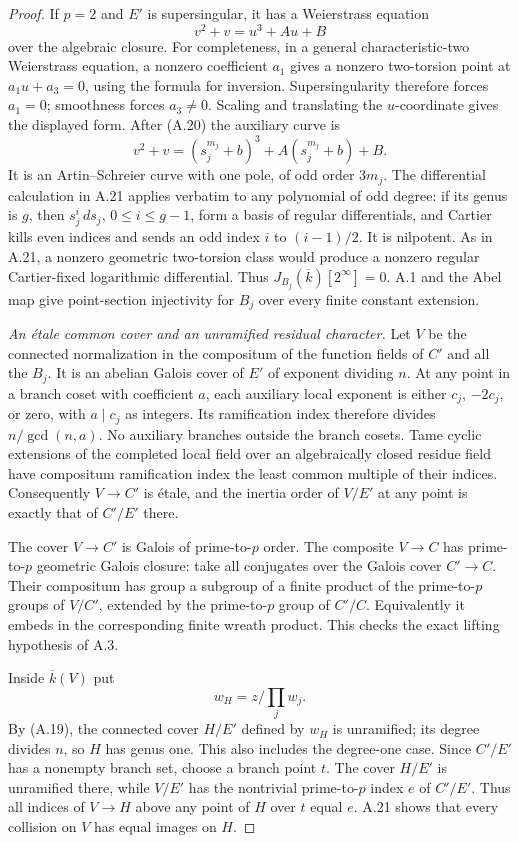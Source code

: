 \begin{proof}
If $p=2$ and $E'$ is supersingular, it has a Weierstrass
equation
\[
 v^2+v=u^3+A u+B
\]
over the algebraic closure. For completeness, in a general
characteristic-two Weierstrass equation, a nonzero coefficient
$a_1$ gives a nonzero two-torsion point at $a_1u+a_3=0$,
using the formula for inversion. Supersingularity therefore
forces $a_1=0$; smoothness forces $a_3\ne0$. Scaling and
translating the $u$-coordinate gives the displayed form.
After (A.20) the auxiliary curve is
\[
 v^2+v=(s_j^{m_j}+b)^3+A(s_j^{m_j}+b)+B.
\]
It is an Artin--Schreier curve with one pole, of odd order
$3m_j$. The differential calculation in A.21 applies
verbatim to any polynomial of odd degree: if its genus is
$g$, then $s_j^i\,ds_j$, $0\le i\le g-1$, form a basis
of regular differentials, and Cartier kills even indices
and sends an odd index $i$ to $(i-1)/2$. It is nilpotent.
As in A.21, a nonzero geometric two-torsion class would
produce a nonzero regular Cartier-fixed logarithmic
differential. Thus $J_{B_j}(\overline k)[2^\infty]=0$.
A.1 and the Abel map give point-section injectivity for
$B_j$ over every finite constant extension.

\emph{An \'etale common cover and an unramified residual character.}
Let $V$ be the connected normalization in the compositum of
the function fields of $C'$ and all the $B_j$. It is an
abelian Galois cover of $E'$ of exponent dividing $n$.
At any point in a branch coset with coefficient $a$, each
auxiliary local exponent is either $c_j$, $-2c_j$, or zero,
with $a\mid c_j$ as integers. Its ramification index
therefore divides $n/\gcd(n,a)$. No auxiliary branches
outside the branch cosets. Tame cyclic extensions of the
completed local field over an algebraically closed residue
field have compositum ramification index the least common
multiple of their indices. Consequently $V\to C'$ is
\'etale, and the inertia order of $V/E'$ at any point is
exactly that of $C'/E'$ there.

The cover $V\to C'$ is Galois of prime-to-$p$ order.
The composite $V\to C$ has prime-to-$p$ geometric Galois
closure: take all conjugates over the Galois cover
$C'\to C$. Their compositum has group a subgroup of a
finite product of the prime-to-$p$ groups of $V/C'$, extended
by the prime-to-$p$ group of $C'/C$. Equivalently it embeds
in the corresponding finite wreath product. This checks
the exact lifting hypothesis of A.3.

Inside $\overline k(V)$ put
\[
 w_H=z\Big/\prod_jw_j.
\]
By (A.19), the connected cover $H/E'$ defined by $w_H$ is
unramified; its degree divides $n$, so $H$ has genus one.
This also includes the degree-one case. Since $C'/E'$ has
a nonempty branch set, choose a branch point $t$. The cover
$H/E'$ is unramified there, while $V/E'$ has the nontrivial
prime-to-$p$ index $e$ of $C'/E'$. Thus all indices of
$V\to H$ above any point of $H$ over $t$ equal $e$.
A.21 shows that every collision on $V$ has equal images
on $H$.


\end{proof}
